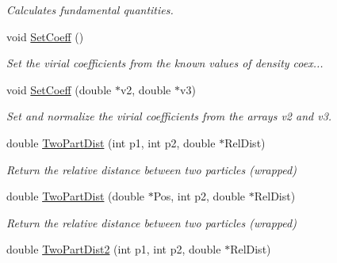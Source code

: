 \begin{DoxyCompactItemize}
\begin{DoxyCompactList}\small\item\em \-Calculates fundamental quantities. \end{DoxyCompactList}\item 
\hypertarget{classVarData_a5dd46e77250756dc756a8a5aae0b575f}{void \hyperlink{classVarData_a5dd46e77250756dc756a8a5aae0b575f}{\-Set\-Coeff} ()}\label{classVarData_a5dd46e77250756dc756a8a5aae0b575f}

\begin{DoxyCompactList}\small\item\em \-Set the virial coefficients from the known values of density coex... \end{DoxyCompactList}\item 
\hypertarget{classVarData_a8e4611ad8a334d8a27c2fb87e7ea0df1}{void \hyperlink{classVarData_a8e4611ad8a334d8a27c2fb87e7ea0df1}{\-Set\-Coeff} (double $\ast$v2, double $\ast$v3)}\label{classVarData_a8e4611ad8a334d8a27c2fb87e7ea0df1}

\begin{DoxyCompactList}\small\item\em \-Set and normalize the virial coefficients from the arrays v2 and v3. \end{DoxyCompactList}\item 
\hypertarget{classVarData_a19886baf2914ac46bc50f333254a4e57}{double \hyperlink{classVarData_a19886baf2914ac46bc50f333254a4e57}{\-Two\-Part\-Dist} (int p1, int p2, double $\ast$\-Rel\-Dist)}\label{classVarData_a19886baf2914ac46bc50f333254a4e57}

\begin{DoxyCompactList}\small\item\em \-Return the relative distance between two particles (wrapped) \end{DoxyCompactList}\item 
\hypertarget{classVarData_a118d59dbacc06ea6d6b4f8e2cf864406}{double \hyperlink{classVarData_a118d59dbacc06ea6d6b4f8e2cf864406}{\-Two\-Part\-Dist} (double $\ast$\-Pos, int p2, double $\ast$\-Rel\-Dist)}\label{classVarData_a118d59dbacc06ea6d6b4f8e2cf864406}

\begin{DoxyCompactList}\small\item\em \-Return the relative distance between two particles (wrapped) \end{DoxyCompactList}\item 
\hypertarget{classVarData_a8c36154f85dd7e41560448d01aab695d}{double \hyperlink{classVarData_a8c36154f85dd7e41560448d01aab695d}{\-Two\-Part\-Dist2} (int p1, int p2, double $\ast$\-Rel\-Dist)}\label{classVarData_a8c36154f85dd7e41560448d01aab695d}


\end{DoxyCompactItemize}
